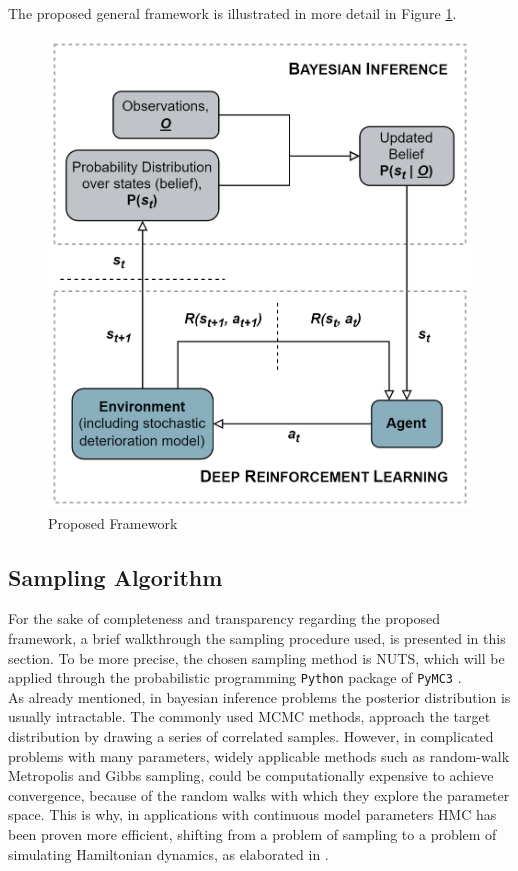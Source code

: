 \newpage

The proposed general framework is illustrated in more detail in Figure \ref{genFlow}.

\begin{figure}[H]
    \centering
	\includegraphics[width=0.54\linewidth]{Figures/generalFlow.png}
	\caption{Proposed Framework}
	\label{genFlow}
\end{figure}




\subsection{Sampling Algorithm} \label{nutsSec}

For the sake of completeness and transparency regarding the proposed framework, a brief walkthrough the sampling procedure used, is presented in this section. To be more precise, the chosen sampling method is \gls{NUTS}, which will be applied through the probabilistic programming \verb|Python| package of \verb|PyMC3| \cite{salvatier2016probabilistic}.\\

As already mentioned, in bayesian inference problems the posterior distribution is usually intractable. The commonly used \gls{MCMC} methods, approach the target distribution by drawing a series of correlated samples. However, in complicated problems with many parameters, widely applicable methods such as random-walk Metropolis and Gibbs sampling, could be computationally expensive to achieve convergence, because of the random walks with which they explore the parameter space. This is why, in applications with continuous model parameters \gls{HMC} has been proven more efficient, shifting from a problem of sampling to a problem of simulating Hamiltonian dynamics, as elaborated in \cite{neal2011mcmc}. \\

